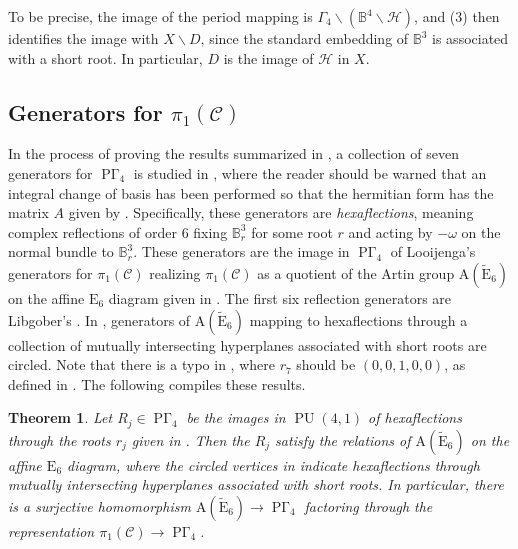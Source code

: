 \documentclass[11pt]{amsart}
\theoremstyle{plain}
\newtheorem{thm}{Theorem}[section]
\theoremstyle{definition}
\theoremstyle{remark}
\newcommand{\bbB}{\mathbb{B}}
\newcommand{\calC}{\mathcal{C}}
\newcommand{\calH}{\mathcal{H}}
\newcommand{\Gam}{\Gamma}
\DeclareMathOperator{\PU}{PU}
\newcommand{\bs}{\backslash}
\newcommand{\ssm}{\smallsetminus}
\DeclareMathOperator{\PGam}{\mathrm{P}\Gamma}
\begin{document}
To be precise, the image of the period mapping is $\Gam_4 \bs\!\left(\bbB^4 \ssm \calH\right)$, and (3) then identifies the image with $X \ssm D$, since the standard embedding of $\bbB^3$ is associated with a short root. In particular, $D$ is the image of $\calH$ in $X$.

\subsection{Generators for $\pi_1(\calC)$}\label{ssec:Gens}

In the process of proving the results summarized in , a collection of seven generators for $\PGam_4$ is studied in \cite[\S 7]{ACT}, where the reader should be warned that an integral change of basis has been performed so that the hermitian form has the matrix $A$ given by \cite[Eq.\ (7.7.1)]{ACT}. Specifically, these generators are \emph{hexaflections}, meaning complex reflections of order $6$ fixing $\bbB^3_r$ for some root $r$ and acting by $-\omega$ on the normal bundle to $\bbB^3_r$. These generators are the image in $\PGam_4$ of Looijenga's generators for $\pi_1(\calC)$ realizing $\pi_1(\calC)$ as a quotient of the Artin group $\mathrm{A}(\widetilde{\mathrm{E}}_6)$ on the affine $\mathrm{E}_6$ diagram given in  \cite{zbMATH05254786}. The first six reflection generators are Libgober's \cite{zbMATH03574026}. In , generators of $\mathrm{A}(\widetilde{\mathrm{E}}_6)$ mapping to hexaflections through a collection of mutually intersecting hyperplanes associated with short roots are circled. Note that there is a typo in \cite[Eq.\ (7.7.2)]{ACT}, where $r_7$ should be $(0,0,1,0,0)$, as defined in \cite[Lem.\ 7.17]{ACT}. The following compiles these results.

\begin{thm}\label{thm:ACTgensE6}
Let $R_j \in \PGam_4$ be the images in $\PU(4,1)$ of hexaflections through the roots $r_j$ given in \cite[\S 7]{ACT}. Then the $R_j$ satisfy the relations of $\mathrm{A}(\widetilde{\mathrm{E}}_6)$ on the affine $\mathrm{E}_6$ diagram, where the circled vertices in  indicate hexaflections through mutually intersecting hyperplanes associated with short roots. In particular, there is a surjective homomorphism $\mathrm{A}(\widetilde{\mathrm{E}}_6)\to \PGam_4$ factoring through the representation $\pi_1(\calC) \to \PGam_4$.
\end{thm}
\end{document}
